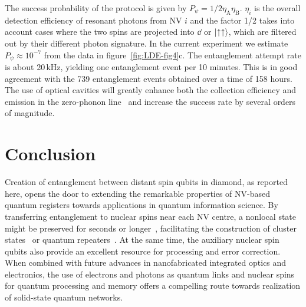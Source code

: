 The success probability of the protocol is given by $P_\psi =1/2 \eta_\text{A}\eta_\text{B}$. $\eta_i$ is the overall detection efficiency of resonant photons from NV $i$ and the factor 1/2 takes into account cases where the two spins are projected into $\dd$ or $\left|\uparrow\uparrow\right\rangle$, which are filtered out by their different photon signature. In the current experiment we estimate $P_\psi \approx10^{-7}$ from the data in figure~\ref{fig:LDE-fig4}c. The entanglement attempt rate is about 20$\,$kHz, yielding one entanglement event per 10 minutes. This is in good agreement with the 739 entanglement events obtained over a time of 158 hours. The use of optical cavities will greatly enhance both the collection efficiency and emission in the zero-phonon line~\cite{Aharonovich2011} and increase the success rate by several orders of magnitude.

\section{Conclusion}

Creation of entanglement between distant spin qubits in diamond, as reported here, opens the door to extending the remarkable properties of NV-based quantum registers towards applications in quantum information science. By transferring entanglement to nuclear spins near each NV centre, a nonlocal state might be preserved for seconds or longer~\cite{Maurer2012}, facilitating the construction of cluster states~\cite{Raussendorf2001} or quantum repeaters~\cite{Childress2006a}. At the same time, the auxiliary nuclear spin qubits also provide an excellent resource for processing and error correction. When combined with future advances in nanofabricated integrated optics and electronics, the use of electrons and photons as quantum links and nuclear spins for quantum processing and memory offers a compelling route towards realization of solid-state quantum networks.


\clearpage



